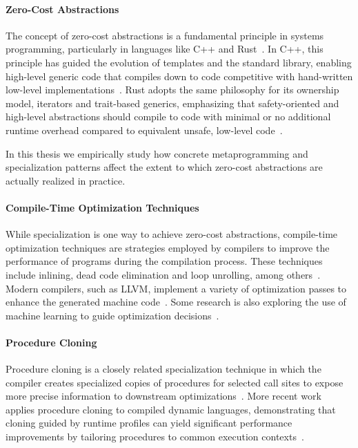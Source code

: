 \paragraph{Zero-Cost Abstractions}
The concept of zero-cost abstractions is a fundamental principle in systems programming, particularly in languages like C++ and Rust~\cite{Ho23}.
In C++, this principle has guided the evolution of templates and the standard library, enabling high-level generic code that compiles down to code competitive with hand-written low-level implementations~\cite{Stroustrup94,Alexandrescu2001ModernCppDesign}.
Rust adopts the same philosophy for its ownership model, iterators and trait-based generics, emphasizing that safety-oriented and high-level abstractions should compile to code with minimal or no additional runtime overhead compared to equivalent unsafe, low-level code~\cite{Ho23,RustBook,RustNomicon}.

In this thesis we empirically study how concrete metaprogramming and specialization patterns affect the extent to which zero-cost abstractions are actually realized in practice.

\paragraph{Compile-Time Optimization Techniques}
While specialization is one way to achieve zero-cost abstractions, compile-time optimization techniques are strategies employed by compilers to improve the performance of programs during the compilation process.
These techniques include inlining, dead code elimination and loop unrolling, among others~\cite{Inlining97, Knoop94, LoopUnrolling99, CloneDetection98}.
Modern compilers, such as LLVM, implement a variety of optimization passes to enhance the generated machine code~\cite{Lattner04}.
Some research is also exploring the use of machine learning to guide optimization decisions~\cite{MLForCompilerOptimizations20}.

\paragraph{Procedure Cloning}
Procedure cloning is a closely related specialization technique in which the compiler creates specialized copies of procedures for selected call sites to expose more precise information to downstream optimizations~\cite{Cooper93}.
More recent work applies procedure cloning to compiled dynamic languages, demonstrating that cloning guided by runtime profiles can yield significant performance improvements by tailoring procedures to common execution contexts~\cite{Husk2022UsingPC}.

